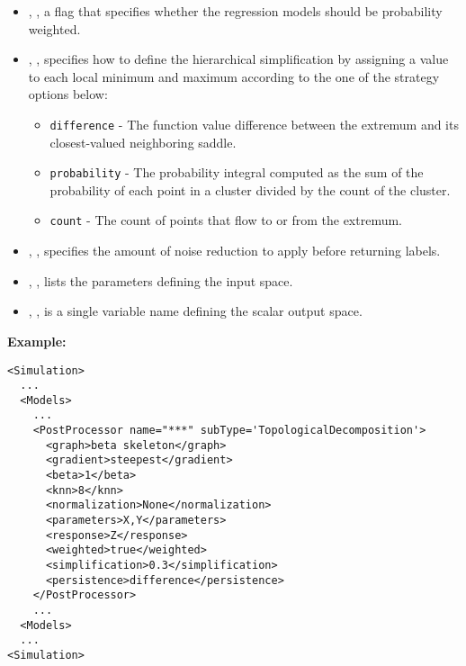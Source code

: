 \begin{itemize}
  \item {}, , a flag that specifies
  whether the regression models should be probability weighted.
  \item {}, , specifies how
  to define the hierarchical simplification by assigning a value to each local
  minimum and maximum according to the one of the strategy options below:
  \begin{itemize}
    \item \texttt{difference} - The function value difference between the
    extremum and its closest-valued neighboring saddle.
    \item \texttt{probability} - The probability integral computed as the
    sum of the probability of each point in a cluster divided by the count of
    the cluster.
    \item \texttt{count} - The count of points that flow to or from the
    extremum.
  \end{itemize}
  \item {}, , specifies the
  amount of noise reduction to apply before returning labels.
  \item {}, ,
  lists the parameters defining the input space.
  \item {}, , is a single
  variable name defining the scalar output space.
\end{itemize}
\textbf{Example:}
\begin{lstlisting}[style=XML,morekeywords={subType}]
<Simulation>
  ...
  <Models>
    ...
    <PostProcessor name="***" subType='TopologicalDecomposition'>
      <graph>beta skeleton</graph>
      <gradient>steepest</gradient>
      <beta>1</beta>
      <knn>8</knn>
      <normalization>None</normalization>
      <parameters>X,Y</parameters>
      <response>Z</response>
      <weighted>true</weighted>
      <simplification>0.3</simplification>
      <persistence>difference</persistence>
    </PostProcessor>
    ...
  <Models>
  ...
<Simulation>
\end{lstlisting}



